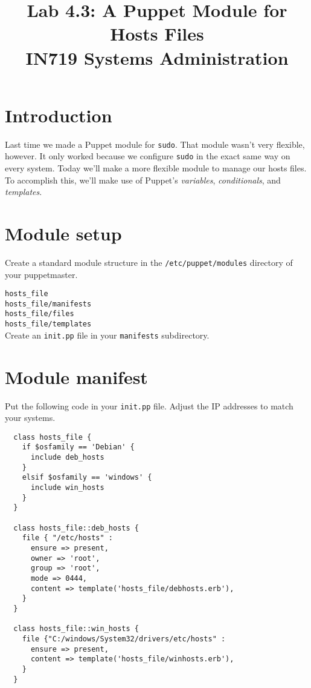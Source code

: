 \documentclass{article}   	%
\title{Lab 4.3: A Puppet Module for Hosts Files \\ IN719 Systems Administration}
\date{}							%
\begin{document}
\maketitle

\section*{Introduction}
Last time we made a Puppet module for \texttt{sudo}.  That module wasn't very flexible, however.  It only worked because we configure \texttt{sudo} in the exact same way on every system. Today we'll make a more flexible module to manage our hosts files.  To accomplish this, we'll make use of Puppet's \emph{variables}, \emph{conditionals}, and \emph{templates}.

\section{Module setup}
Create a standard module structure in the \texttt{/etc/puppet/modules} directory of your puppetmaster.

\texttt{hosts\_file} \\
\texttt{hosts\_file/manifests} \\
\texttt{hosts\_file/files} \\
\texttt{hosts\_file/templates} \\

Create an \texttt{init.pp} file in your \texttt{manifests} subdirectory.

\section{Module manifest}
Put the following code in your \texttt{init.pp} file.  Adjust the IP addresses to match your systems.

\begin{verbatim}
  class hosts_file {
    if $osfamily == 'Debian' {
      include deb_hosts
    }
    elsif $osfamily == 'windows' {
      include win_hosts
    }
  }

  class hosts_file::deb_hosts {
    file { "/etc/hosts" :
      ensure => present,
      owner => 'root',
      group => 'root',
      mode => 0444,
      content => template('hosts_file/debhosts.erb'),
    }
  }

  class hosts_file::win_hosts {
    file {"C:/windows/System32/drivers/etc/hosts" :
      ensure => present,
      content => template('hosts_file/winhosts.erb'),
    }
  }
  
\end{verbatim}
\end{document}
